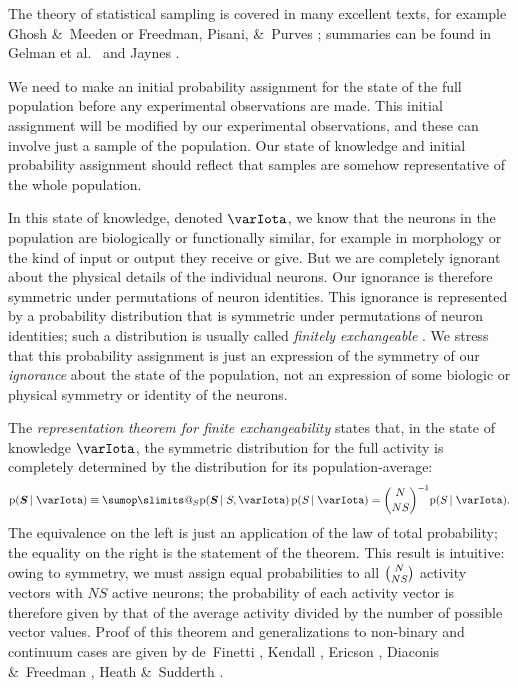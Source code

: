 \documentclass[\ifafour a4paper,12pt,\else a5paper,10pt,\fi%
onecolumn,oneside,article,%
british%
]{memoir}
\makeatletter
\theoremstyle{remark}
\theoremstyle{innote}
\def\sum{\DOTSI\sumop\slimits@}
\newcommand*{\citep}{\parencites}
\newcommand*{\citey}{\parencites*}
\newcommand*{\amp}{\&}
\newcommand*{\pf}{\mathrm{p}}%
\renewcommand*{\|}{\nonscript\,\vert\nonscript\;\mathopen{}}
\newcommand*{\chap}{ch.}%
\newcommand*{\etal}{{et al.}}
\newcommand*{\yRv}{S}
\newcommand*{\yNv}{N}
\newcommand*{\yR}{\bm{\yRv}}%
\newcommand*{\yRf}{\yRv}%
\newcommand*{\yH}{\varIota}
\makeatother
\begin{document}
\bigskip

The theory of statistical sampling is covered in many excellent texts, for
example Ghosh \amp\ Meeden \citey{ghoshetal1997} or Freedman, Pisani, \amp\
Purves \citey[parts~I, VI]{freedmanetal1978_r2007}; summaries can be found
in Gelman \etal\ \citey[\chap~8]{gelmanetal1995_r2014} and Jaynes
\citey[\chap~3]{jaynes1994_r2003}.

We need to make an initial probability assignment for the state of the full
population before any experimental observations are made. This initial
assignment will be modified by our experimental observations, and these can
involve just a sample of the population. Our state of knowledge and initial
probability assignment should reflect that samples are somehow
representative of the whole population.

In this state of knowledge, denoted $\yH$, we know that the neurons in the
population are biologically or functionally similar, for example in
morphology or the kind of input or output they receive or give. But we are
completely ignorant about the physical details of the individual neurons.
Our ignorance is therefore symmetric under permutations of neuron
identities. This ignorance is represented by a probability distribution
that is symmetric under permutations of neuron identities; such a
distribution is usually called \emph{finitely exchangeable}
\citep{ericson1969}[\chap~1]{ghoshetal1997}. We stress that this
probability assignment is just an expression of the symmetry of our
\emph{ignorance} about the state of the population, not an expression of
some biologic or physical symmetry or identity of the neurons.

The \emph{representation theorem for finite exchangeability} states that,
in the state of knowledge $\yH$, the symmetric distribution for the full
activity is completely determined by the distribution for its
population-average:
\begin{equation}
  \label{eq:joint_plaus_N_homog}
  \pf(\yR \|  \yH) \equiv
  \sum_{\yRf}\pf(\yR \| \yRf, \yH)\,
  \pf(\yRf \| \yH) =
  \binom{\yNv}{\yNv\yRf}^{-1} \pf(\yRf \| \yH).
\end{equation}
The equivalence on the left is just an application of the law of total
probability; the equality on the right is the statement of the theorem.
This result is intuitive: owing to symmetry, we must assign equal
probabilities to all $\tbinom{\yNv}{\yNv\yRf}$ activity vectors with
$\yNv\yRf$ active neurons; the probability of each activity vector is
therefore given by that of the average activity divided by the number of
possible vector values. Proof of this theorem and generalizations to
non-binary and continuum cases are given by de~Finetti
\citey{definetti1959b}, Kendall \citey{kendall1967}, Ericson
\citey{ericson1976}, Diaconis \amp\ Freedman
\citey{diaconis1977,diaconisetal1980}, Heath \amp\ Sudderth
\citey{heathetal1976}.
\end{document}
